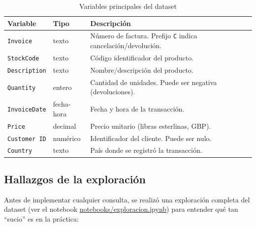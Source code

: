 \begin{table}[H]
\centering
\begin{tabular}{lll}
\toprule
\textbf{Variable} & \textbf{Tipo} & \textbf{Descripción} \\
\midrule
\texttt{Invoice} & texto & Número de factura. Prefijo \texttt{C} indica cancelación/devolución. \\
\texttt{StockCode} & texto & Código identificador del producto. \\
\texttt{Description} & texto & Nombre/descripción del producto. \\
\texttt{Quantity} & entero & Cantidad de unidades. Puede ser negativa (devoluciones). \\
\texttt{InvoiceDate} & fecha-hora & Fecha y hora de la transacción. \\
\texttt{Price} & decimal & Precio unitario (libras esterlinas, GBP). \\
\texttt{Customer ID} & numérico & Identificador del cliente. Puede ser nulo. \\
\texttt{Country} & texto & País donde se registró la transacción. \\
\bottomrule
\end{tabular}
\caption{Variables principales del dataset}
\end{table}

\subsection{Hallazgos de la exploración}

Antes de implementar cualquier consulta, se realizó una exploración completa del dataset (ver el notebook \url{notebooks/exploracion.ipynb}) para entender qué tan ``sucio'' es en la práctica:

